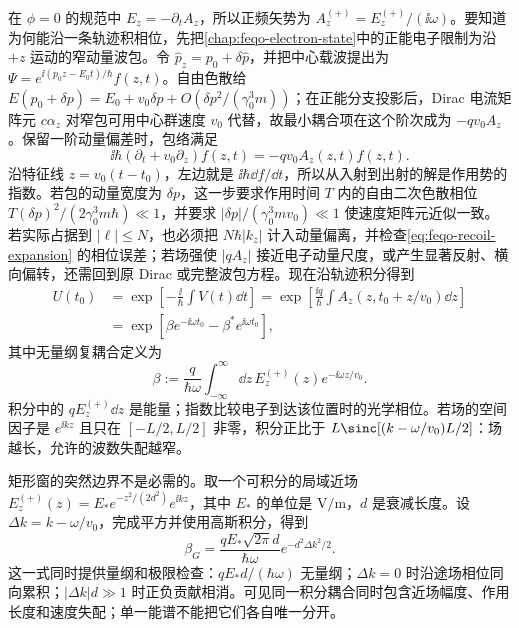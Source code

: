 在 \(\phi=0\) 的规范中 \(E_z=-\partial_tA_z\)，所以正频矢势为 \(A_z^{(+)}=E_z^{(+)}/(\ii\omega)\)。要知道为何能沿一条轨迹积相位，先把\cref{chap:feqo-electron-state}中的正能电子限制为沿 \(+z\) 运动的窄动量波包。令 \(\hat p_z=p_0+\delta\hat p\)，并把中心载波提出为 \(\Psi=e^{\ii(p_0z-E_0t)/\hbar}f(z,t)\)。自由色散给 \(E(p_0+\delta p)=E_0+v_0\delta p+O(\delta p^2/(\gamma_0^3m))\)；在正能分支投影后，Dirac 电流矩阵元 \(c\alpha_z\) 对窄包可用中心群速度 \(v_0\) 代替，故最小耦合项在这个阶次成为 \(-qv_0A_z\)。保留一阶动量偏差时，包络满足
\begin{equation}
\ii\hbar(\partial_t+v_0\partial_z)f(z,t)
=-qv_0A_z(z,t)f(z,t).
\label{eq:feqo-pinem-transport}
\end{equation}
沿特征线 \(z=v_0(t-t_0)\)，左边就是 \(\ii\hbar\dd f/\dd t\)，所以从入射到出射的解是作用势的指数。若包的动量宽度为 \(\delta p\)，这一步要求作用时间 \(T\) 内的自由二次色散相位 \(T(\delta p)^2/(2\gamma_0^3m\hbar)\ll1\)，并要求 \(|\delta p|/(\gamma_0^3mv_0)\ll1\) 使速度矩阵元近似一致。若实际占据到 \(|\ell|\leq N\)，也必须把 \(N\hbar|k_z|\) 计入动量偏离，并检查\cref{eq:feqo-recoil-expansion} 的相位误差；若场强使 \(|qA_z|\) 接近电子动量尺度，或产生显著反射、横向偏转，还需回到原 Dirac 或完整波包方程。现在沿轨迹积分得到
\begin{align*}
U(t_0)&=\exp\!\left[-\frac{\ii}{\hbar}\int V(t)\dd t\right]
=\exp\!\left[\frac{\ii q}{\hbar}\int A_z(z,t_0+z/v_0)\dd z\right]\\
&=\exp\!\left[\beta e^{-\ii\omega t_0}-\beta^*e^{\ii\omega t_0}\right],
\end{align*}
其中无量纲复耦合定义为
\begin{equation}
\beta:=\frac{q}{\hbar\omega}\int_{-\infty}^{\infty}\dd z\,
E_z^{(+)}(z)e^{-\ii\omega z/v_0}.
\label{eq:feqo-beta}
\end{equation}
积分中的 \(qE_z^{(+)}\dd z\) 是能量；指数比较电子到达该位置时的光学相位。若场的空间因子是 \(e^{\ii kz}\) 且只在 \([-L/2,L/2]\) 非零，积分正比于 \(L\sinc[(k-\omega/v_0)L/2]\)：场越长，允许的波数失配越窄。

矩形窗的突然边界不是必需的。取一个可积分的局域近场 \(E_z^{(+)}(z)=E_*e^{-z^2/(2d^2)}e^{\ii kz}\)，其中 \(E_*\) 的单位是 \(\si{\volt\per\metre}\)，\(d\) 是衰减长度。设 \(\Delta k=k-\omega/v_0\)，完成平方并使用高斯积分，得到
\begin{equation}
\beta_G=\frac{qE_*\sqrt{2\pi}d}{\hbar\omega}
e^{-d^2\Delta k^2/2}.
\label{eq:feqo-gaussian-near-field-coupling}
\end{equation}
这一式同时提供量纲和极限检查：\(qE_*d/(\hbar\omega)\) 无量纲；\(\Delta k=0\) 时沿途场相位同向累积；\(|\Delta k|d\gg1\) 时正负贡献相消。可见同一积分耦合同时包含近场幅度、作用长度和速度失配；单一能谱不能把它们各自唯一分开。

